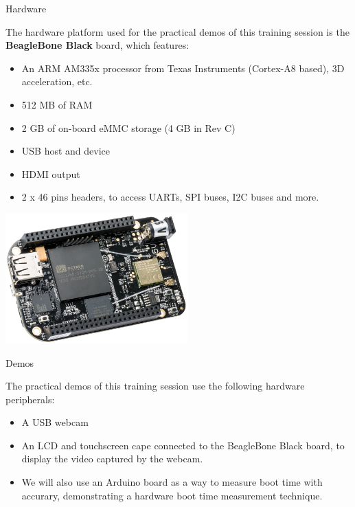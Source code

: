 \documentclass[a4paper,12pt,obeyspaces,spaces,hyphens]{article}
\begin{document}
\feshowtitle

\onlinepedagogics
{}
\certificate{}
\disabilities{}

\feagendatwocolumn
{Hardware}
{
  The hardware platform used for the practical demos of this training
  session is the {\bf BeagleBone Black} board, which features:

  \begin{itemize}
  \item An ARM AM335x processor from Texas Instruments (Cortex-A8
    based), 3D acceleration, etc.
  \item 512 MB of RAM
  \item 2 GB of on-board eMMC storage
        \newline(4 GB in Rev C)
  \item USB host and device
  \item HDMI output
  \item 2 x 46 pins headers, to access UARTs, SPI buses, I2C buses
    and more.
  \end{itemize}
}
{}
{
  \begin{center}
    \includegraphics[height=5cm]{../slides/beagleboneblack-board/beagleboneblack.png}
  \end{center}
}

\feagendaonecolumn
{Demos}
{
  The practical demos of this training session use the following
  hardware peripherals:

  \begin{itemize}
  \item A USB webcam
  \item An LCD and touchscreen cape connected to the
    BeagleBone Black board, to display the video captured by the webcam.
  \item We will also use an Arduino board as a way to measure boot time with accurary,
    demonstrating a hardware boot time measurement technique.
  \end{itemize}
}
\end{document}

